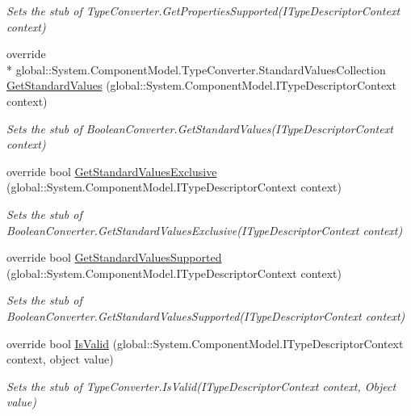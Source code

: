 \begin{DoxyCompactItemize}
\begin{DoxyCompactList}\small\item\em Sets the stub of Type\-Converter.\-Get\-Properties\-Supported(\-I\-Type\-Descriptor\-Context context)\end{DoxyCompactList}\item 
override \\*
global\-::\-System.\-Component\-Model.\-Type\-Converter.\-Standard\-Values\-Collection \hyperlink{class_system_1_1_component_model_1_1_fakes_1_1_stub_boolean_converter_a0de68387e8cfcf5d88059d56514a9843}{Get\-Standard\-Values} (global\-::\-System.\-Component\-Model.\-I\-Type\-Descriptor\-Context context)
\begin{DoxyCompactList}\small\item\em Sets the stub of Boolean\-Converter.\-Get\-Standard\-Values(\-I\-Type\-Descriptor\-Context context)\end{DoxyCompactList}\item 
override bool \hyperlink{class_system_1_1_component_model_1_1_fakes_1_1_stub_boolean_converter_a8679b9bc609ec49b162d8e69ba62afad}{Get\-Standard\-Values\-Exclusive} (global\-::\-System.\-Component\-Model.\-I\-Type\-Descriptor\-Context context)
\begin{DoxyCompactList}\small\item\em Sets the stub of Boolean\-Converter.\-Get\-Standard\-Values\-Exclusive(\-I\-Type\-Descriptor\-Context context)\end{DoxyCompactList}\item 
override bool \hyperlink{class_system_1_1_component_model_1_1_fakes_1_1_stub_boolean_converter_ae97b36aefb9440638b5e0493b9b6b220}{Get\-Standard\-Values\-Supported} (global\-::\-System.\-Component\-Model.\-I\-Type\-Descriptor\-Context context)
\begin{DoxyCompactList}\small\item\em Sets the stub of Boolean\-Converter.\-Get\-Standard\-Values\-Supported(\-I\-Type\-Descriptor\-Context context)\end{DoxyCompactList}\item 
override bool \hyperlink{class_system_1_1_component_model_1_1_fakes_1_1_stub_boolean_converter_a1ea6238ad86ef3a77cc897874053f541}{Is\-Valid} (global\-::\-System.\-Component\-Model.\-I\-Type\-Descriptor\-Context context, object value)
\begin{DoxyCompactList}\small\item\em Sets the stub of Type\-Converter.\-Is\-Valid(\-I\-Type\-Descriptor\-Context context, Object value)\end{DoxyCompactList}\end{DoxyCompactItemize}
